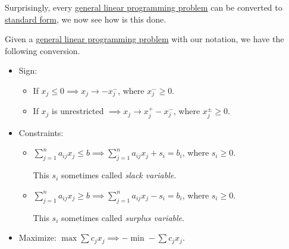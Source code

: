 \begin{remark}
	Surprisingly, every \hyperref[def:general-linear-programming-problem]{general linear programming problem} can be converted to \hyperref[def:standard-form]{standard form},
	we now see how is this done.
\end{remark}
\begin{explanation}
	Given a \hyperref[def:general-linear-programming-problem]{general linear programming problem} with our notation, we have the following conversion.
	\begin{itemize}
		\item Sign:
		      \begin{itemize}
			      \item If \(x_{j}\leq 0 \implies x_j \to -x_j^-\), where \(x_{j}^- \geq 0\).
			      \item If \(x_{j}\) is unrestricted \(\implies x_j \to x_j^+ - x_{j}^-\), where \(x_j^{\pm} \geq 0\).
		      \end{itemize}
		\item Constraints:
		      \begin{itemize}
			      \item \(\sum\limits_{j=1}^{n} a_{ij} x_{j} \leq b \implies \sum\limits_{j=1}^{n} a_{ij} x_{j} + s_i = b_{i}\), where \(s_i \geq 0\).
			            \begin{definition}\label{def:slack-variable}
				            This \(s_i\) sometimes called \emph{slack variable}.
			            \end{definition}
			      \item \(\sum\limits_{j=1}^{n} a_{ij} x_{j} \geq b \implies \sum\limits_{j=1}^{n} a_{ij} x_{j} - s_i = b_{i}\), where \(s_i \geq 0\).
			            \begin{definition}\label{def:surplus-variable}
				            This \(s_i\) sometimes called \emph{surplus variable}.
			            \end{definition}
		      \end{itemize}
		\item Maximize: \(\max \sum c_{j}x_{j} \implies -\min -\sum c_{j}x_{j}\).
	\end{itemize}
\end{explanation}